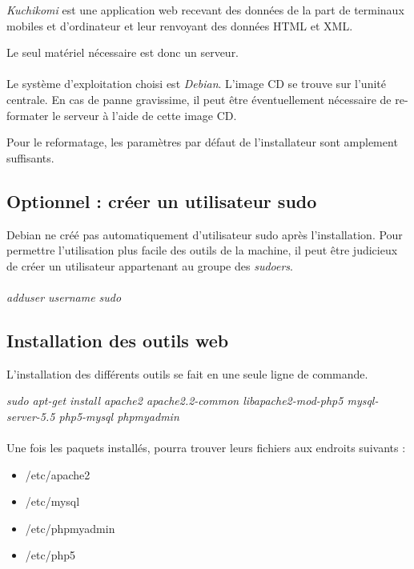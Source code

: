 \documentclass[a4paper,12pt,titlepage]{article}
\begin{document}
\emph{Kuchikomi} est une application web recevant des données de la part de terminaux mobiles et d'ordinateur et leur renvoyant des données HTML et XML.

Le seul matériel nécessaire est donc un serveur.

\paragraph{}

Le système d'exploitation choisi est \emph{Debian}. L'image CD se trouve sur l'unité centrale. En cas de panne gravissime, il peut être éventuellement nécessaire de re-formater le serveur à l'aide de cette image CD.

Pour le reformatage, les paramètres par défaut de l'installateur sont amplement suffisants.



\subsection{Optionnel : créer un utilisateur sudo}

Debian ne créé pas automatiquement d'utilisateur sudo après l'installation. Pour permettre l'utilisation plus facile des outils de la machine, il peut être judicieux de créer un utilisateur appartenant au groupe des \emph{sudoers}.

\paragraph{}

\emph{adduser username sudo}

\subsection{Installation des outils web}

L'installation des différents outils se fait en une seule ligne de commande.

\emph{sudo apt-get install apache2 apache2.2-common libapache2-mod-php5 mysql-server-5.5 php5-mysql phpmyadmin}
\paragraph{}
Une fois les paquets installés, pourra trouver leurs fichiers aux endroits suivants :
\begin{itemize}
\item /etc/apache2
\item /etc/mysql
\item /etc/phpmyadmin
\item /etc/php5
\end{itemize}
\newpage
\end{document}
